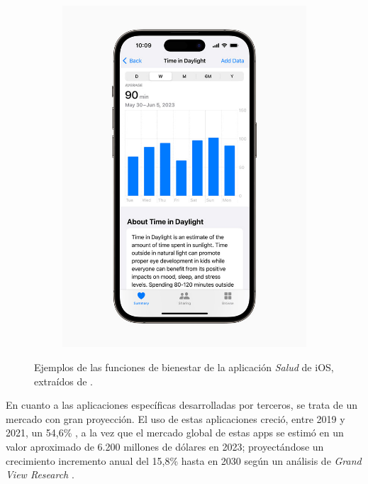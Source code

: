 \begin{figure}[h]
\begin{subfigure}[t]{0.49\textwidth}
                \includegraphics[width=1\linewidth]{figures/ios salud visual.jpg}
            \end{subfigure}
            \caption[Ejemplos de las funciones de bienestar de la aplicación \textit{Salud} de iOS]{Ejemplos de las funciones de bienestar de la aplicación \textit{Salud} de iOS, extraídos de \cite{noauthor_apple_2023}.}
            \label{fig:estado_arte:ios_salud}
        \end{figure}

        En cuanto a las aplicaciones específicas desarrolladas por terceros, se trata de un mercado con gran proyección. El uso de estas aplicaciones creció, entre 2019 y 2021, un 54,6\% \cite{bejerano_lado_2023}, a la vez que el mercado global de estas apps se estimó en un valor aproximado de 6.200 millones de dólares en 2023; proyectándose un crecimiento incremento anual del 15,8\% hasta en 2030 según un análisis de \textit{Grand View Research} \cite{grand_view_research_mental_nodate}.
        
